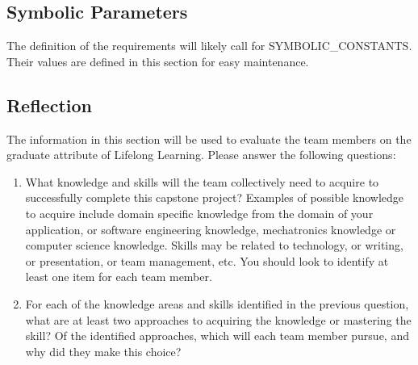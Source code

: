 \documentclass[12pt]{article}
\begin{document}
\subsection{Symbolic Parameters}

The definition of the requirements will likely call for SYMBOLIC\_CONSTANTS.
Their values are defined in this section for easy maintenance.

\subsection{Reflection}

The information in this section will be used to evaluate the team members on the
graduate attribute of Lifelong Learning.  Please answer the following questions:

\begin{enumerate}
  \item What knowledge and skills will the team collectively need to acquire to
  successfully complete this capstone project?  Examples of possible knowledge
  to acquire include domain specific knowledge from the domain of your
  application, or software engineering knowledge, mechatronics knowledge or
  computer science knowledge.  Skills may be related to technology, or writing,
  or presentation, or team management, etc.  You should look to identify at
  least one item for each team member.
  \item For each of the knowledge areas and skills identified in the previous
  question, what are at least two approaches to acquiring the knowledge or
  mastering the skill?  Of the identified approaches, which will each team
  member pursue, and why did they make this choice?
\end{enumerate}
\end{document}
